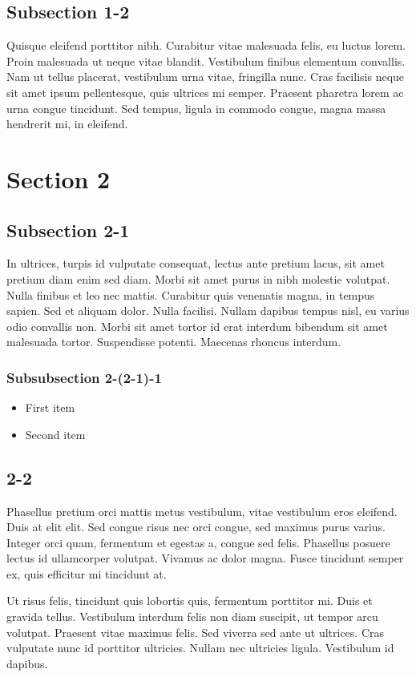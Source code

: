  \subsection{Subsection 1-2}
    Quisque eleifend porttitor nibh. Curabitur vitae malesuada felis, eu luctus lorem. Proin malesuada ut neque vitae blandit. Vestibulum finibus elementum convallis. Nam ut tellus placerat, vestibulum urna vitae, fringilla nunc. Cras facilisis neque sit amet ipsum pellentesque, quis ultrices mi semper. Praesent pharetra lorem ac urna congue tincidunt. Sed tempus, ligula in commodo congue, magna massa hendrerit mi, in eleifend.

\section{Section 2}
  \subsection{Subsection 2-1}
    In ultrices, turpis id vulputate consequat, lectus ante pretium lacus, sit amet pretium diam enim sed diam. Morbi sit amet purus in nibh molestie volutpat. Nulla finibus et leo nec mattis. Curabitur quis venenatis magna, in tempus sapien. Sed et aliquam dolor. Nulla facilisi. Nullam dapibus tempus nisl, eu varius odio convallis non. Morbi sit amet tortor id erat interdum bibendum sit amet malesuada tortor. Suspendisse potenti. Maecenas rhoncus interdum.

    \subsubsection{Subsubsection 2-(2-1)-1}
      \begin{itemize}
        \item First item
        \item Second item
      \end{itemize}

  \subsection{2-2}
    Phasellus pretium orci mattis metus vestibulum, vitae vestibulum eros eleifend. Duis at elit elit. Sed congue risus nec orci congue, sed maximus purus varius. Integer orci quam, fermentum et egestas a, congue sed felis. Phasellus posuere lectus id ullamcorper volutpat. Vivamus ac dolor magna. Fusce tincidunt semper ex, quis efficitur mi tincidunt at.

    Ut risus felis, tincidunt quis lobortis quis, fermentum porttitor mi. Duis et gravida tellus. Vestibulum interdum felis non diam suscipit, ut tempor arcu volutpat. Praesent vitae maximus felis. Sed viverra sed ante ut ultrices. Cras vulputate nunc id porttitor ultricies. Nullam nec ultricies ligula. Vestibulum id dapibus.
